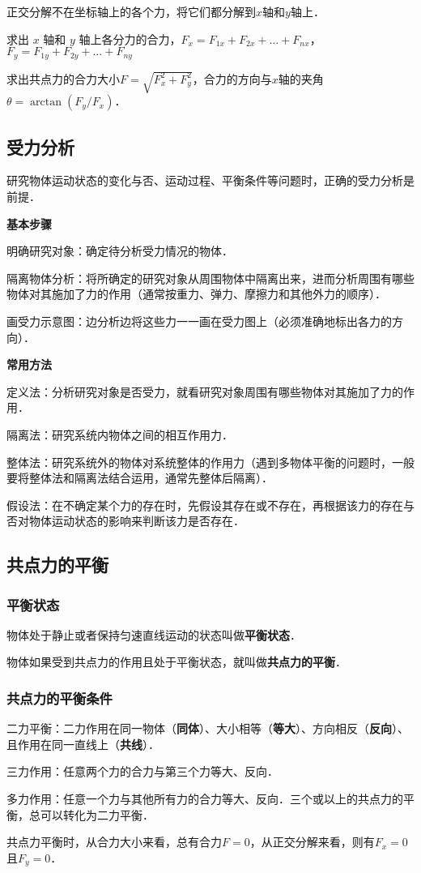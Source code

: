 正交分解不在坐标轴上的各个力，将它们都分解到$x$轴和$y$轴上．

求出 $x$ 轴和 $y$ 轴上各分力的合力，$F_{x}=F_{{1x}}+F_{{2x}}+\dots+F_{{nx}}$，$F_{y}=F_{{1y}}+F_{{2y}}+\dots+F_{{ny}}$

求出共点力的合力大小$F=\sqrt{F_x^2+F_y^2}$，合力的方向与$x$轴的夹角$\theta=\arctan(F_y/F_x)$．

\subsection{受力分析}
研究物体运动状态的变化与否、运动过程、平衡条件等问题时，正确的受力分析是前提．

\textbf{基本步骤}

明确研究对象：确定待分析受力情况的物体．

隔离物体分析：将所确定的研究对象从周围物体中隔离出来，进而分析周围有哪些物体对其施加了力的作用（通常按重力、弹力、摩擦力和其他外力的顺序）．

画受力示意图：边分析边将这些力一一画在受力图上（必须准确地标出各力的方向）．

\textbf{常用方法}

定义法：分析研究对象是否受力，就看研究对象周围有哪些物体对其施加了力的作用．

隔离法：研究系统内物体之间的相互作用力．

整体法：研究系统外的物体对系统整体的作用力（遇到多物体平衡的问题时，一般要将整体法和隔离法结合运用，通常先整体后隔离）．

假设法：在不确定某个力的存在时，先假设其存在或不存在，再根据该力的存在与否对物体运动状态的影响来判断该力是否存在．

\subsection{共点力的平衡}
\subsubsection{平衡状态}
物体处于静止或者保持匀速直线运动的状态叫做\textbf{平衡状态}．

物体如果受到共点力的作用且处于平衡状态，就叫做\textbf{共点力的平衡}．

\subsubsection{共点力的平衡条件}
二力平衡：二力作用在同一物体（\textbf{同体}）、大小相等（\textbf{等大}）、方向相反（\textbf{反向}）、且作用在同一直线上（\textbf{共线}）．

三力作用：任意两个力的合力与第三个力等大、反向．

多力作用：任意一个力与其他所有力的合力等大、反向．三个或以上的共点力的平衡，总可以转化为二力平衡．

共点力平衡时，从合力大小来看，总有合力$F=0$，从正交分解来看，则有$F_x=0$且$F_y=0$．